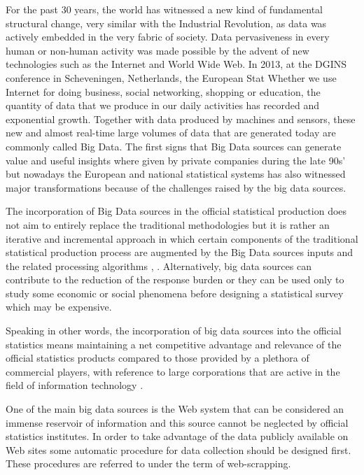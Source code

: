 \documentclass[]{article}
\begin{document}
For the past 30 years, the world has witnessed a new kind of fundamental structural change, very similar with the Industrial Revolution, 
as data was actively embedded in the very fabric of society. Data pervasiveness in every human or non-human activity was made possible
by the advent of new technologies such as the Internet and World Wide Web. In 2013, at the DGINS conference in Scheveningen, Netherlands,
the European Stat        
Whether we use Internet for doing business, social networking, shopping or education, the quantity of data that 
we produce in our daily activities has recorded and exponential growth. Together with data produced by machines and sensors, these new and 
almost real-time large volumes of data that are generated today are commonly called Big Data. The first signs that Big Data sources 
can generate value and useful insights where given by private companies during the late 90s' but nowadays the European and national 
statistical systems has also witnessed major transformations because of the challenges raised by the big data sources. 


The incorporation of Big Data sources in the official statistical production does not aim to entirely replace the 
traditional methodologies but it is rather an iterative and incremental approach in which certain components of the traditional 
statistical production process are augmented by the Big Data sources inputs and the related processing algorithms 
\cite{grif2016_1}, \cite{grif2016_2}. Alternatively, big data sources can contribute to the reduction of the response burden 
or they can be used only to study some economic or social phenomena before designing a statistical survey which may be expensive. 

Speaking in other words, the incorporation of big data sources into the official statistics means maintaining a net competitive advantage and 
relevance of the official statistics products compared to those provided by a plethora of commercial players, with reference to 
large corporations that are active in the field of information technology \cite{eu2012}.

One of the main big data sources is the Web system that can be considered an immense reservoir of information and this source cannot be neglected
by official statistics institutes. In order to take advantage of the data publicly available on Web sites some automatic procedure for data collection 
should be designed first. These procedures are referred to under the term of web-scrapping.
\end{document}
